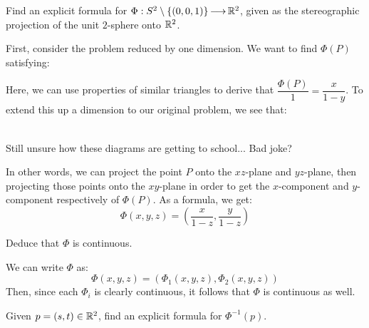 \newpage
\label{q23}
\begin{qu}[num=23.1]
    Find an explicit formula for $ \Phi : S^{2} \setminus \left\{{(0, 0, 1)}\right\} \operatorname{\longrightarrow}
    \mathbb{R}^{2} $, given as the stereographic projection of the unit $ 2 $-sphere
    onto $ \mathbb{R}^{2} $.
\end{qu}

\begin{soln}
    First, consider the problem reduced by one dimension.
    We want to find $ \Phi(P) $ satisfying:

    \centering
    \flushleft

    Here, we can use properties of similar triangles to derive that
    $ \dfrac{\Phi(P)}{1} = \dfrac{x}{1-y} $.
    To extend this up a dimension to our original problem, we see that:
    
    \centering
     \\
    \small Still unsure how these diagrams are getting to school... Bad joke?
    \flushleft
    
    \normalsize
    In other words, we can project the point $ P $ onto the $ xz $-plane and
    $ yz $-plane, then projecting those points onto the $ xy $-plane in order to
    get the $ x $-component and $ y $-component respectively of $ \Phi(P) $. As a
    formula, we get:
    \begin{equation*}
        \Phi(x, y, z) = \left( \frac{x}{1-z}, \frac{y}{1-z} \right)
    \end{equation*}
\end{soln}

\begin{qu}[num=23.2]
    Deduce that $ \Phi $ is continuous.
\end{qu}

\begin{soln}
    We can write $ \Phi $ as:
    \begin{equation*}
        \Phi(x, y, z) = (\Phi_{1}(x,y,z), \Phi_{2}(x,y,z))
    \end{equation*}
    Then, since each $ \Phi_{i} $ is clearly continuous, it follows that $ \Phi $
    is continuous as well.
\end{soln}

\vspace{-0.1in}
\begin{qu}[num=23.3]
    Given $ p = (s, t) \in \mathbb{R}^{2} $, find an explicit formula for
    $ \Phi^{-1}(p) $.
\end{qu}

